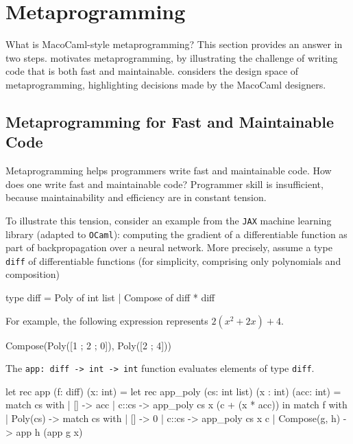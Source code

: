 \section{Metaprogramming}\label{section:metaprogramming-technical}
What is MacoCaml-style metaprogramming? This section provides an answer in two steps.  motivates metaprogramming, by illustrating the challenge of writing code that is both fast and maintainable.  considers the design space of metaprogramming, highlighting decisions made by the MacoCaml designers.

\subsection{Metaprogramming for Fast and Maintainable Code}\label{subsection:metaprogramming-motivation}

Metaprogramming helps programmers write fast and maintainable code. How does one write fast and maintainable code? Programmer skill is insufficient, because maintainability and efficiency are in constant tension. 

To illustrate this tension, consider an example from the \texttt{JAX} machine learning library (adapted to \texttt{OCaml}): computing the gradient of a differentiable function as part of backpropagation over a neural network. More precisely, assume a type \texttt{diff} of differentiable functions (for simplicity, comprising only polynomials and composition)

\begin{ocaml}
type diff = Poly of int list 
          | Compose of diff * diff
\end{ocaml}
For example, the following expression represents $2(x^2 + 2x) + 4$. 
\begin{ocaml}
Compose(Poly([1 ; 2 ; 0]), Poly([2 ; 4]))
\end{ocaml}

The \texttt{app: diff -> int -> int} function evaluates elements of type \texttt{diff}. 

\begin{ocaml}
let rec app (f: diff) (x: int) = 
  let rec app_poly (cs: int list) (x : int) (acc: int) = match cs with 
    | [] -> acc 
    | c::cs -> app_poly cs x (c + (x * acc)) 
  in match f with 
    | Poly(cs)      -> match cs with 
                      | [] -> 0
                      | c::cs -> app_poly cs x c
    | Compose(g, h) -> app h (app g x)
\end{ocaml}

